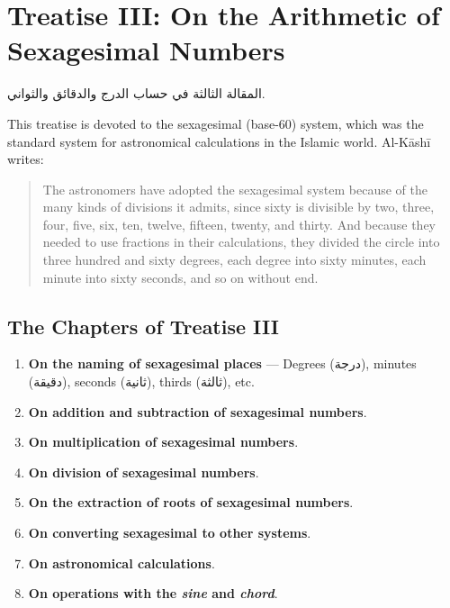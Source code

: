 \documentclass[11pt,a4paper]{article}
\newenvironment{arabicbox}{%
  \begin{framed}
  \begin{minipage}{\dimexpr\linewidth-2\fboxsep-2\fboxrule\relax}
  \setlength{\parindent}{0pt}
  \linespread{1.3}\selectfont
}{%
  \end{minipage}
  \end{framed}
}
\newcommand{\ar}[1]{{\arabicfont\beginR #1\endR}}
\begin{document}
\section{Treatise III: On the Arithmetic of Sexagesimal Numbers}
\label{sec:treatise3}

\begin{arabicbox}
\begin{Arabic}
المقالة الثالثة في حساب الدرج والدقائق والثواني.
\end{Arabic}
\end{arabicbox}

\vspace{0.3cm}

\noindent This treatise is devoted to the sexagesimal (base-60) system,
which was the standard system for astronomical calculations in the
Islamic world. Al-K\=ash\=i writes:

\begin{quote}
The astronomers have adopted the sexagesimal system because of the many
kinds of divisions it admits, since sixty is divisible by two, three,
four, five, six, ten, twelve, fifteen, twenty, and thirty. And because
they needed to use fractions in their calculations, they divided the
circle into three hundred and sixty degrees, each degree into sixty
minutes, each minute into sixty seconds, and so on without end.
\end{quote}

\subsection{The Chapters of Treatise III}

\begin{enumerate}[label=\textbf{Ch.\arabic*:}]
  \item \textbf{On the naming of sexagesimal places} --- Degrees
  (\ar{درجة}), minutes (\ar{دقيقة}), seconds (\ar{ثانية}), thirds
  (\ar{ثالثة}), etc.
  \item \textbf{On addition and subtraction of sexagesimal numbers}.
  \item \textbf{On multiplication of sexagesimal numbers}.
  \item \textbf{On division of sexagesimal numbers}.
  \item \textbf{On the extraction of roots of sexagesimal numbers}.
  \item \textbf{On converting sexagesimal to other systems}.
  \item \textbf{On astronomical calculations}.
  \item \textbf{On operations with the \textit{sine} and
  \textit{chord}}.
\end{enumerate}
\end{document}
